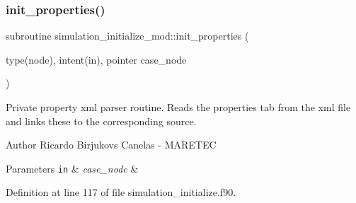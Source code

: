 \subsubsection{\texorpdfstring{init\+\_\+properties()}{init\_properties()}}
{\footnotesize\ttfamily subroutine simulation\+\_\+initialize\+\_\+mod\+::init\+\_\+properties (\begin{DoxyParamCaption}\item[{type(node), intent(in), pointer}]{case\+\_\+node }\end{DoxyParamCaption})\hspace{0.3cm}{\ttfamily [private]}}



Private property xml parser routine. Reads the properties tab from the xml file and links these to the corresponding source. 

\begin{DoxyAuthor}{Author}
Ricardo Birjukovs Canelas -\/ M\+A\+R\+E\+T\+EC 
\end{DoxyAuthor}

\begin{DoxyParams}[1]{Parameters}
\mbox{\tt in}  & {\em case\+\_\+node} & \\
\hline
\end{DoxyParams}


Definition at line 117 of file simulation\+\_\+initialize.\+f90.


